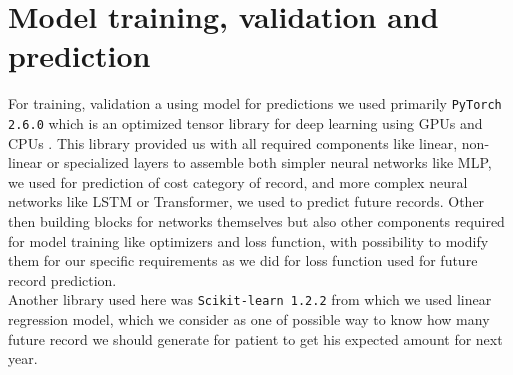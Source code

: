 \newpage

\section{Model training, validation and prediction}
\label{modelDesign}

For training, validation a using model for predictions we used primarily \texttt{PyTorch 2.6.0} which is an optimized tensor library for deep learning using GPUs and CPUs \cite{pytorch}. This library provided us with all required components like linear, non-linear or specialized layers to assemble both simpler neural networks like MLP, we used for prediction of cost category of record, and more complex neural networks like LSTM or Transformer, we used to predict future records. Other then building blocks for networks themselves but also other components required for model training like optimizers and loss function, with possibility to modify them for our specific requirements as we did for loss function used for future record prediction.
\\

Another library used here was \texttt{Scikit-learn 1.2.2} from which we used linear regression model, which we consider as one of possible way to know how many future record we should generate for patient to get his expected amount for next year.